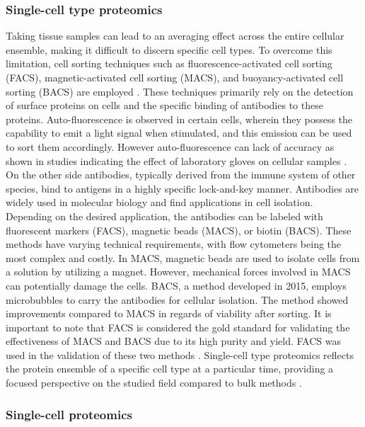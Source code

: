 \documentclass[
  11pt,
]{article}
\begin{document}
\hypertarget{single-cell-type-proteomics}{%
\subsubsection{Single-cell type
proteomics}\label{single-cell-type-proteomics}}

Taking tissue samples can lead to an averaging effect across the entire
cellular ensemble, making it difficult to discern specific cell types.
To overcome this limitation, cell sorting techniques such as
fluorescence-activated cell sorting (FACS), magnetic-activated cell
sorting (MACS), and buoyancy-activated cell sorting (BACS) are employed
\citep{Liou2015}. These techniques primarily rely on the detection of
surface proteins on cells and the specific binding of antibodies to
these proteins. Auto-fluorescence is observed in certain cells, wherein
they possess the capability to emit a light signal when stimulated, and
this emission can be used to sort them accordingly. However
auto-fluorescence can lack of accuracy as shown in studies indicating
the effect of laboratory gloves on cellular samples
\citep{Philpott2017}. On the other side antibodies, typically derived
from the immune system of other species, bind to antigens in a highly
specific lock-and-key manner. Antibodies are widely used in molecular
biology and find applications in cell isolation. Depending on the
desired application, the antibodies can be labeled with fluorescent
markers (FACS), magnetic beads (MACS), or biotin (BACS). These methods
have varying technical requirements, with flow cytometers being the most
complex and costly. In MACS, magnetic beads are used to isolate cells
from a solution by utilizing a magnet. However, mechanical forces
involved in MACS can potentially damage the cells. BACS, a method
developed in 2015, employs microbubbles to carry the antibodies for
cellular isolation. The method showed improvements compared to MACS in
regards of viability after sorting. It is important to note that FACS is
considered the gold standard for validating the effectiveness of MACS
and BACS due to its high purity and yield. FACS was used in the
validation of these two methods \citep{Liou2015, Sutermaster2019}.
Single-cell type proteomics reflects the protein ensemble of a specific
cell type at a particular time, providing a focused perspective on the
studied field compared to bulk methods \citep{Maes2020}.

\hypertarget{single-cell-proteomics}{%
\subsubsection{Single-cell proteomics}\label{single-cell-proteomics}}
\end{document}
